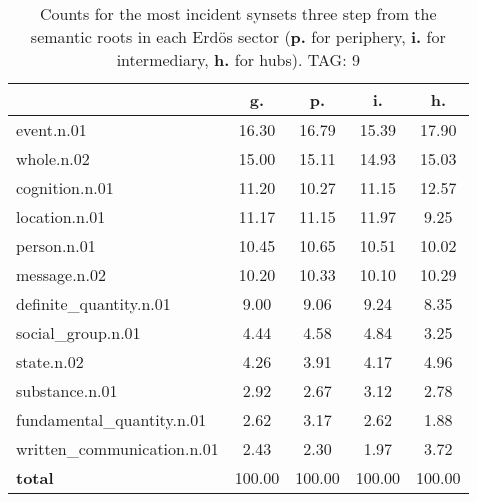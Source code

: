 \begin{table}[h!]
\begin{center}
\begin{tabular}{| l || c | c | c | c |}\hline
 & {\bf g.} & {\bf p.} & {\bf i.} & {\bf h.} \\\hline\hline
event.n.01 & 16.30  & 16.79  & 15.39  & 17.90 \\\hline
whole.n.02 & 15.00  & 15.11  & 14.93  & 15.03 \\\hline
cognition.n.01 & 11.20  & 10.27  & 11.15  & 12.57 \\\hline
location.n.01 & 11.17  & 11.15  & 11.97  & 9.25 \\\hline
person.n.01 & 10.45  & 10.65  & 10.51  & 10.02 \\\hline
message.n.02 & 10.20  & 10.33  & 10.10  & 10.29 \\\hline
definite\_quantity.n.01 & 9.00  & 9.06  & 9.24  & 8.35 \\\hline
social\_group.n.01 & 4.44  & 4.58  & 4.84  & 3.25 \\\hline
state.n.02 & 4.26  & 3.91  & 4.17  & 4.96 \\\hline
substance.n.01 & 2.92  & 2.67  & 3.12  & 2.78 \\\hline
fundamental\_quantity.n.01 & 2.62  & 3.17  & 2.62  & 1.88 \\\hline
written\_communication.n.01 & 2.43  & 2.30  & 1.97  & 3.72 \\\hline\hline
{{\bf total}} & 100.00  & 100.00  & 100.00  & 100.00 \\\hline
\end{tabular}
\caption{Counts for the most incident synsets three step from the semantic roots in each Erd\"os sector ({\bf p.} for periphery, {\bf i.} for intermediary, {\bf h.} for hubs). TAG: 9}
\end{center}
\end{table}